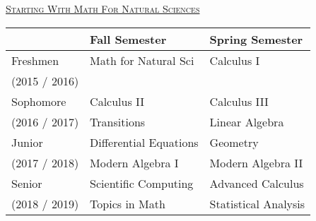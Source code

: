 \documentclass[letterpaper,10pt]{article}
\begin{document}
\bigskip

\begin{center}
\begin{minipage}[t]{.45\textwidth}

\underline{\scshape  \Large Starting With Math For Natural Sciences}\\


\begin{tabular}{l|l|l}
	&{\bf Fall Semester} & {\bf Spring Semester}\\
\hline
Freshmen & Math for Natural Sci & Calculus I \\
\scriptsize (2015 / 2016) & & \\
\hline
Sophomore & Calculus II & Calculus III\\
\scriptsize (2016 / 2017) & Transitions & Linear Algebra\\[2pt]
\hline
Junior & Differential Equations & Geometry \\
\scriptsize (2017 / 2018)& Modern Algebra I & Modern Algebra II\\[2pt]
\hline
Senior & Scientific Computing &  Advanced Calculus \\
\scriptsize (2018 / 2019)&  {\color{gray}Topics in Math} & Statistical Analysis
\end{tabular} 
\end{minipage}
\end{center}
\vspace{0.15in}
\end{document}
